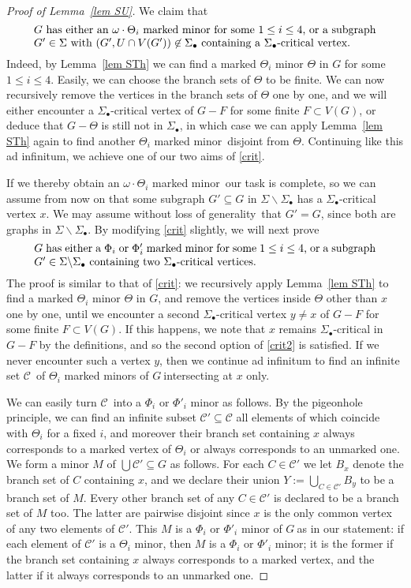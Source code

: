 \documentclass{article}
\newcommand{\SU}{\ensuremath{\Sig_\bullet}}
\newcommand{\mm}{marked minor}
\newcommand{\Sig}{\ensuremath{\Sigma}}
\newcommand{\omdot}{\omega \cdot}
\newcommand{\cc}{\ensuremath{\mathcal C}}
\newcommand{\sm}{\backslash}
\newcommand{\g}{\ensuremath{G\ }}
\newcommand{\Lr}[1]{Lemma~\ref{#1}}
\newcommand{\obda}{without loss of generality}
\newcommand{\labtequ}[2]{\begin{equation} \label{#1} 	\begin{minipage}[c]{0.9\textwidth}  #2 \end{minipage} \ignorespacesafterend \end{equation} }
\begin{document}
\begin{proof}[Proof of \Lr{lem SU}]
We claim that 
\labtequ{crit}{\g has
either  an $\omdot \Theta_i$ \mm\ for some $1\leq i \leq 4$, or a subgraph $G'\in \Sig$ with $(G' ,U \cap V(G')) \not\in \SU$ containing a  \SU-critical vertex.}
Indeed, by \Lr{lem STh} we can find a marked $\Theta_i$ minor $\Theta$ in $G$ for some $1\leq i \leq 4$. Easily, we can choose the branch sets of $\Theta$ to be finite. We can now recursively remove the vertices in the branch sets of $\Theta$ one by one, and we will either encounter a \SU-critical vertex of $G-F$ for some finite $F\subset V(G)$, or deduce that $G-\Theta$ is still not in \SU, in which case we can apply \Lr{lem STh} again to find another $\Theta_i$ \mm\ disjoint from $\Theta$. Continuing like this ad infinitum, we achieve one of our two aims of \eqref{crit}. 

If we thereby obtain an $\omdot \Theta_i$ \mm\ our task is complete, so we can assume from now on that some subgraph $G' \subseteq G$ in $\Sig \sm \SU$ has a  \SU-critical vertex  $x$. We may assume \obda\ that $G'=G$, since both are graphs in $\Sig \sm \SU$. By modifying \eqref{crit} slightly, we will next prove 
\labtequ{crit2}{\g has
either  a $\Phi_i$ or $\Phi'_i$ \mm\ for some $1\leq i \leq 4$, or a subgraph $G'\in \Sig \sm \SU$ containing two  \SU-critical vertices.}
The proof is similar to that of \eqref{crit}: we recursively apply 
 \Lr{lem STh} to find a marked $\Theta_i$ minor $\Theta$ in $G$, and remove the vertices inside $\Theta$ other than $x$ one by one, until we encounter a second \SU-critical vertex $y\neq x$ of $G-F$ for some finite $F\subset V(G)$. If this happens, we note that $x$ remains \SU-critical in $G-F$ by the definitions, and so the second option of \eqref{crit2} is satisfied. If we never encounter such a vertex $y$, then we continue ad infinitum to find an infinite set \cc\ of $\Theta_i$ \mm s of \g intersecting at $x$ only. 
 
 We can easily turn \cc\ into a $\Phi_i$ or $\Phi'_i$ minor as follows. By the pigeonhole principle, we can find an infinite subset $\cc' \subseteq \cc$ all elements of which coincide with $\Theta_i$ for a fixed $i$, and moreover their branch set containing $x$ always corresponds to a  marked vertex of $\Theta_i$ or always corresponds to an unmarked one. We form a minor $M$ of $\bigcup \cc' \subseteq G$ as follows. For each $C\in \cc'$ we let $B_x$ denote the branch set of $C$ containing $x$, and we declare their union $Y:= \bigcup_{C\in \cc'} B_y$ to be a branch set of $M$. Every other branch set of any $C\in \cc'$ is declared to be a branch set of $M$ too. The latter are pairwise disjoint since $x$ is the only common vertex of any two elements of $\cc'$. This $M$ is a $\Phi_i$ or $\Phi'_i$ minor of \g as in our statement: if each element of $\cc'$ is a $\Theta_i$ minor, then $M$ is a $\Phi_i$ or $\Phi'_i$ minor; it is the former if the branch set containing $x$ always corresponds to a marked vertex, and the latter if it always corresponds to an unmarked one.
 

\end{proof}
\end{document}
